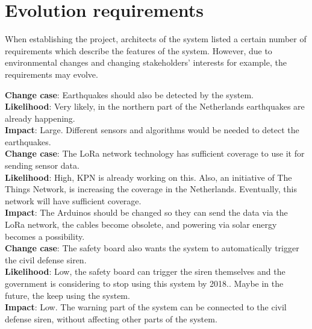 \section{Evolution requirements}
\label{sec:evolution-requirements}


When establishing the project, architects of the system listed a certain number of requirements which describe the features of the system. However, due to environmental changes and changing stakeholders' interests for example, the requirements may evolve.


	
\textbf{Change case}: Earthquakes should also be detected by the system. \\
\textbf{Likelihood}: Very likely, in the northern part of the Netherlands earthquakes are already happening. \\ 
\textbf{Impact}:  Large. Different sensors and algorithms would be needed to detect the earthquakes. \\


\textbf{Change case}: The LoRa network technology has sufficient coverage to use it for sending sensor data. \\
\textbf{Likelihood}: High, KPN is already working on this. Also, an initiative of The Things Network, is increasing the coverage in the Netherlands. Eventually, this network will have sufficient coverage. \\
\textbf{Impact}: The Arduinos should be changed so they can send the data via the LoRa network, the cables become obsolete, and powering via solar energy becomes a possibility. \\


\textbf{Change case}: The safety board also wants the system to automatically trigger the civil defense siren. \\
\textbf{Likelihood}: Low, the safety board can trigger the siren themselves and the government is considering to stop using this system by 2018.\cite{luchtalarm}. Maybe in the future, the keep using the system. \\
\textbf{Impact}: Low. The warning part of the system can be connected to the civil defense siren, without affecting other parts of the system.



